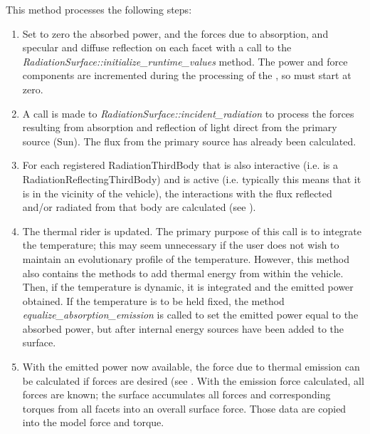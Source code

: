 {\begin{enumerate}
{\begin{enumerate}
\label{method:updatefacetsurface}
This method processes the following steps:

{\begin{enumerate}
\item Set to zero the absorbed power, and the forces due to absorption, and
specular and diffuse reflection on each facet with a call to the
\textit{RadiationSurface::initialize\_runtime\_values} method.  The power and
force components are incremented during the processing of the
\RadiationPressureDesc, so must start at zero.

\item A call is made to \textit{RadiationSurface::incident\_radiation} to
process the forces resulting from absorption and reflection of light direct
from the primary source (Sun).  The flux from the primary source has already
been calculated.

\item For each registered RadiationThirdBody that is also interactive (i.e. is
a RadiationReflectingThirdBody) and is active (i.e. typically this means that
it is in the vicinity of the vehicle), the interactions with the flux reflected
and/or radiated from that body are calculated (see
).

\item The thermal rider is updated.  The primary purpose of this call is to
integrate the temperature; this may seem unnecessary if the user does not wish
to maintain an evolutionary profile of the temperature.  However, this method
also contains the methods to add thermal energy from within the vehicle.  Then,
if the temperature is dynamic, it is integrated and the emitted power obtained.
 If the temperature is to be held fixed, the method
 \textit{equalize\_absorption\_emission} is called to set the emitted power
 equal to the absorbed power, but after internal energy sources have been added
 to the surface.

\item With the emitted power now available, the force due to thermal emission
can be calculated if forces are desired (see
.  With the
emission force calculated, all forces are known; the surface accumulates all
forces and corresponding torques from all facets into an overall surface force.
 Those data are copied into the model force and torque.

\end{enumerate}}



\end{enumerate}}
\end{enumerate}}
